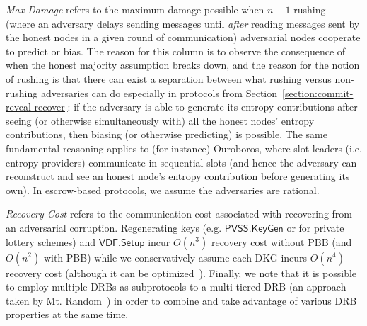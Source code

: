 \textit{Max Damage} refers to the maximum damage possible when $n - 1$ rushing~\cite{gennaro1999secure} (where an adversary delays sending messages until \textit{after} reading messages sent by the honest nodes in a given round of communication) adversarial nodes cooperate to predict or bias.
The reason for this column is to observe the consequence of when the honest majority assumption breaks down, and the reason for the notion of rushing is that there can exist a separation between what rushing versus non-rushing adversaries can do especially in protocols from Section~\ref{section:commit-reveal-recover}: if the adversary is able to generate its entropy contributions after seeing (or otherwise simultaneously with) all the honest nodes' entropy contributions, then biasing (or otherwise predicting) is possible.
The same fundamental reasoning applies to (for instance) Ouroboros, where slot leaders (i.e. entropy providers) communicate in sequential slots (and hence the adversary can reconstruct and see an honest node's entropy contribution before generating its own).
In escrow-based protocols, we assume the adversaries are rational.

\textit{Recovery Cost} refers to the communication cost associated with recovering from an adversarial corruption.
Regenerating keys (e.g. $\mathsf{PVSS.KeyGen}$ or for private lottery schemes) and $\mathsf{VDF.Setup}$ incur $O(n^3)$ recovery cost without PBB (and $O(n^2)$ with PBB) while we conservatively assume each DKG incurs $O(n^4)$ recovery cost (although it can be optimized~\cite{gurkan2021aggregatable}).
Finally, we note that it is possible to employ multiple DRBs as subprotocols to a multi-tiered DRB (an approach taken by Mt. Random~\cite{cascudo2021mt}) in order to combine and take advantage of various DRB properties at the same time.

